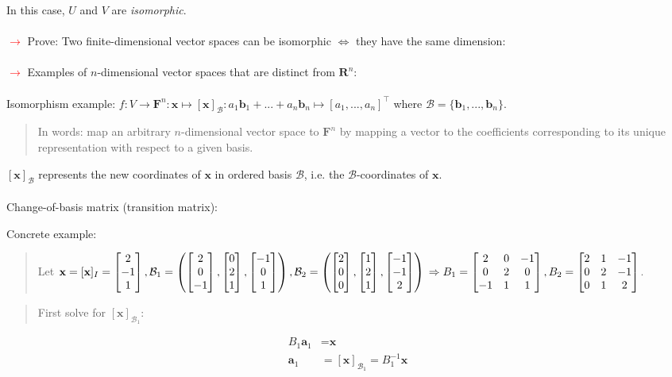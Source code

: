 \documentclass[a4paper]{article}
\newcommand{\inv}{^{-1}}
\newcommand{\x}{\textbf{x}}
\newcommand{\F}{\textbf{F}}
\newcommand{\bv}{\textbf{b}}
\newcommand{\av}{\textbf{a}}
\newcommand{\R}{\textbf{R}}
\newcommand{\att}{\textcolor{red}{$\rightarrow$ }}
\newcommand{\Bcal}{\mathcal{B}}
\newcommand{\bm}[1]{\begin{bmatrix} #1 \end{bmatrix}}
\begin{document}
In this case, $U$ and $V$ are \textit{isomorphic}. \\~\\
\att Prove: Two finite-dimensional vector spaces can be isomorphic $\iff$ they have the same dimension: \\~\\
\att Examples of $n$-dimensional vector spaces that are distinct from $\R^n$: \\~\\
Isomorphism example: $f: V \rightarrow \F^n: \x \mapsto [\x]_\Bcal: a_1 \bv_1+...+a_n \bv_n \mapsto [a_1,...,a_n]^\top $ where $\Bcal=\{\bv_1,...,\bv_n\}$.
\begin{quote}In words: map an arbitrary $n$-dimensional vector space to $\F^n$ by mapping a vector to the coefficients corresponding to its unique representation with respect to a given basis.\end{quote}
$[\x]_\Bcal$ represents the new coordinates of $\x$ in ordered basis $\Bcal$, i.e. the $\Bcal$-coordinates of $\x$.\\~\\
Change-of-basis matrix (transition matrix):
\begin{quote}\end{quote}
Concrete example:
\begin{quote}Let $\x=[\x]_I=\bm{2\\-1\\1}, \Bcal_1=\left( \bm{2\\0\\-1}, \bm{0\\2\\1}, \bm{-1\\0\\1} \right), \Bcal_2=\left( \bm{2\\0\\0}, \bm{1\\2\\1}, \bm{-1\\-1\\2} \right) \\ \Rightarrow B_1=\bm{2&0&-1\\0&2&0\\-1&1&1}, B_2=\bm{2&1&-1\\0&2&-1\\0&1&2}$.\end{quote}
\begin{quote}First solve for $[\x]_{\Bcal_1}$: \end{quote}
                                                                      \begin{align*}
                                                                      B_1 \av_1&= \x \\
                                                                      \av_1 &= [\x]_{\Bcal_1} = B_1\inv \x \\
                                                                      \end{align*}
\end{document}
